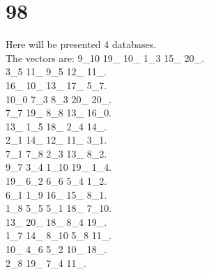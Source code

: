 \chapter{98}
\indent Here will be presented 4 databases.\\
The vectors are:
9\_10 19\_ 10\_ 1\_3 15\_ 20\_.\\3\_5 11\_ 9\_5 12\_ 11\_.\\16\_ 10\_ 13\_ 17\_ 5\_7.\\10\_0 7\_3 8\_3 20\_ 20\_.\\7\_7 19\_ 8\_8 13\_ 16\_0.\\13\_ 1\_5 18\_ 2\_4 14\_.\\2\_1 14\_ 12\_ 11\_ 3\_1.\\7\_1 7\_8 2\_3 13\_ 8\_2.\\9\_7 3\_4 1\_10 19\_ 1\_4.\\19\_ 6\_2 6\_6 5\_4 1\_2.\\6\_1 1\_9 16\_ 15\_ 8\_1.\\1\_8 5\_5 5\_1 18\_ 7\_10.\\13\_ 20\_ 18\_ 8\_4 19\_.\\1\_7 14\_ 8\_10 5\_8 11\_.\\10\_ 4\_6 5\_2 10\_ 18\_.\\2\_8 19\_ 7\_4 11\_.\\